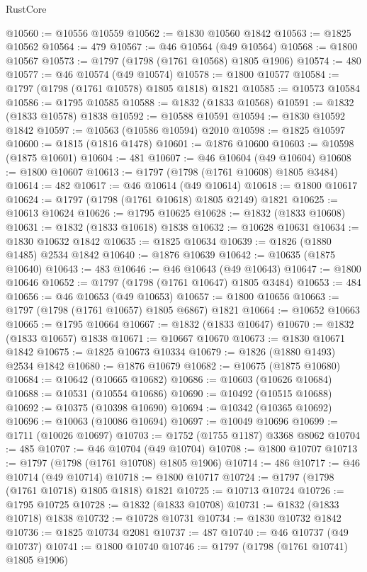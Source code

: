 \begin{lexlean}{RustCore}
\begin{coremodule}
@10560 := @10556 @10559
@10562 := @1830 @10560 @1842
@10563 := @1825 @10562
@10564 := 479
@10567 := @46 @10564 (@49 @10564)
@10568 := @1800 @10567
@10573 := @1797 (@1798 (@1761 @10568) @1805 @1906)
@10574 := 480
@10577 := @46 @10574 (@49 @10574)
@10578 := @1800 @10577
@10584 := @1797 (@1798 (@1761 @10578) @1805 @1818) @1821
@10585 := @10573 @10584
@10586 := @1795 @10585
@10588 := @1832 (@1833 @10568)
@10591 := @1832 (@1833 @10578) @1838
@10592 := @10588 @10591
@10594 := @1830 @10592 @1842
@10597 := @10563 (@10586 @10594) @2010
@10598 := @1825 @10597
@10600 := @1815 (@1816 @1478)
@10601 := @1876 @10600
@10603 := @10598 (@1875 @10601)
@10604 := 481
@10607 := @46 @10604 (@49 @10604)
@10608 := @1800 @10607
@10613 := @1797 (@1798 (@1761 @10608) @1805 @3484)
@10614 := 482
@10617 := @46 @10614 (@49 @10614)
@10618 := @1800 @10617
@10624 := @1797 (@1798 (@1761 @10618) @1805 @2149) @1821
@10625 := @10613 @10624
@10626 := @1795 @10625
@10628 := @1832 (@1833 @10608)
@10631 := @1832 (@1833 @10618) @1838
@10632 := @10628 @10631
@10634 := @1830 @10632 @1842
@10635 := @1825 @10634
@10639 := @1826 (@1880 @1485) @2534 @1842
@10640 := @1876 @10639
@10642 := @10635 (@1875 @10640)
@10643 := 483
@10646 := @46 @10643 (@49 @10643)
@10647 := @1800 @10646
@10652 := @1797 (@1798 (@1761 @10647) @1805 @3484)
@10653 := 484
@10656 := @46 @10653 (@49 @10653)
@10657 := @1800 @10656
@10663 := @1797 (@1798 (@1761 @10657) @1805 @6867) @1821
@10664 := @10652 @10663
@10665 := @1795 @10664
@10667 := @1832 (@1833 @10647)
@10670 := @1832 (@1833 @10657) @1838
@10671 := @10667 @10670
@10673 := @1830 @10671 @1842
@10675 := @1825 @10673 @10334
@10679 := @1826 (@1880 @1493) @2534 @1842
@10680 := @1876 @10679
@10682 := @10675 (@1875 @10680)
@10684 := @10642 (@10665 @10682)
@10686 := @10603 (@10626 @10684)
@10688 := @10531 (@10554 @10686)
@10690 := @10492 (@10515 @10688)
@10692 := @10375 (@10398 @10690)
@10694 := @10342 (@10365 @10692)
@10696 := @10063 (@10086 @10694)
@10697 := @10049 @10696
@10699 := @1711 (@10026 @10697)
@10703 := @1752 (@1755 @1187) @3368 @8062
@10704 := 485
@10707 := @46 @10704 (@49 @10704)
@10708 := @1800 @10707
@10713 := @1797 (@1798 (@1761 @10708) @1805 @1906)
@10714 := 486
@10717 := @46 @10714 (@49 @10714)
@10718 := @1800 @10717
@10724 := @1797 (@1798 (@1761 @10718) @1805 @1818) @1821
@10725 := @10713 @10724
@10726 := @1795 @10725
@10728 := @1832 (@1833 @10708)
@10731 := @1832 (@1833 @10718) @1838
@10732 := @10728 @10731
@10734 := @1830 @10732 @1842
@10736 := @1825 @10734 @2081
@10737 := 487
@10740 := @46 @10737 (@49 @10737)
@10741 := @1800 @10740
@10746 := @1797 (@1798 (@1761 @10741) @1805 @1906)

\end{coremodule}
\end{lexlean}
